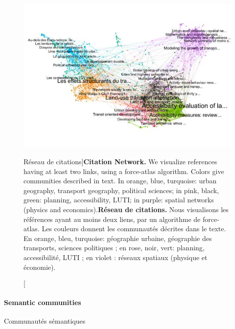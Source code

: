 \begin{figure}[!ht]
\includegraphics[width=\linewidth]{Figures/Final/2-2-2-fig-quantepistemo-citnw.jpg}
\caption[Citation Network][Réseau de citations]{\textbf{Citation Network.} We visualize references having at least two links, using a force-atlas algorithm. Colors give communities described in text. In orange, blue, turquoise: urban geography, transport geography, political sciences; in pink, black, green: planning, accessibility, LUTI; in purple: spatial networks (physics and economics).\label{fig:quantepistemo:citnw}}{\textbf{Réseau de citations.} Nous visualisons les références ayant au moins deux liens, par un algorithme de force-atlas. Les couleurs donnent les communautés décrites dans le texte. En orange, bleu, turquoise: géographie urbaine, géographie des transports, sciences politiques ; en rose, noir, vert: planning, accessibilité, LUTI ; en violet : réseaux spatiaux (physique et économie).\label{fig:quantepistemo:citnw}}
\end{figure}





\paragraph{Semantic communities}{Communautés sémantiques}


